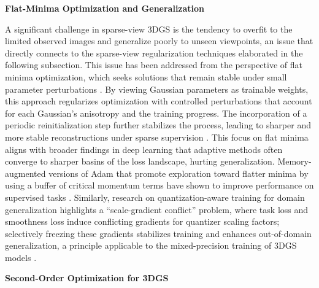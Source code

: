 \documentclass[11pt]{article}
\begin{document}
\textbf{Flat-Minima Optimization and Generalization}

A significant challenge in sparse-view 3DGS is the tendency to overfit to the limited observed images and generalize poorly to unseen viewpoints, an issue that directly connects to the sparse-view regularization techniques elaborated in the following subsection. This issue has been addressed from the perspective of flat minima optimization, which seeks solutions that remain stable under small parameter perturbations \cite{ref154}. By viewing Gaussian parameters as trainable weights, this approach regularizes optimization with controlled perturbations that account for each Gaussian's anisotropy and the training progress. The incorporation of a periodic reinitialization step further stabilizes the process, leading to sharper and more stable reconstructions under sparse supervision \cite{ref154}. This focus on flat minima aligns with broader findings in deep learning that adaptive methods often converge to sharper basins of the loss landscape, hurting generalization. Memory-augmented versions of Adam that promote exploration toward flatter minima by using a buffer of critical momentum terms have shown to improve performance on supervised tasks \cite{ref155}. Similarly, research on quantization-aware training for domain generalization highlights a ``scale-gradient conflict'' problem, where task loss and smoothness loss induce conflicting gradients for quantizer scaling factors; selectively freezing these gradients stabilizes training and enhances out-of-domain generalization, a principle applicable to the mixed-precision training of 3DGS models \cite{ref156}.

\textbf{Second-Order Optimization for 3DGS}
\end{document}
